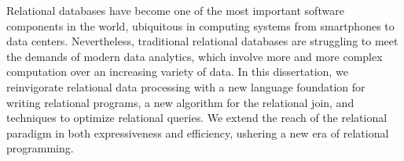 Relational databases have become one of the most
 important software components in the world,
 ubiquitous in computing systems from smartphones to data centers.
Nevertheless, traditional relational databases are struggling 
 to meet the demands of modern data analytics,
 which involve more and more complex computation 
 over an increasing variety of data.
In this dissertation, we reinvigorate relational data processing 
 with a new language foundation for writing relational programs,
 a new algorithm for the relational join,
 and techniques to optimize relational queries.
We extend the reach of the relational paradigm in 
 both expressiveness and efficiency, 
 ushering a new era of relational programming.
